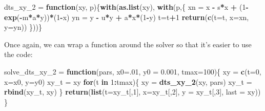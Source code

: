 \documentclass[
]{book}
\newenvironment{Shaded}{\begin{snugshade}}{\end{snugshade}}
\newcommand{\AttributeTok}[1]{\textcolor[rgb]{0.13,0.29,0.53}{#1}}
\newcommand{\ControlFlowTok}[1]{\textcolor[rgb]{0.13,0.29,0.53}{\textbf{#1}}}
\newcommand{\DecValTok}[1]{\textcolor[rgb]{0.00,0.00,0.81}{#1}}
\newcommand{\FloatTok}[1]{\textcolor[rgb]{0.00,0.00,0.81}{#1}}
\newcommand{\FunctionTok}[1]{\textcolor[rgb]{0.13,0.29,0.53}{\textbf{#1}}}
\newcommand{\NormalTok}[1]{#1}
\newcommand{\OtherTok}[1]{\textcolor[rgb]{0.56,0.35,0.01}{#1}}
\newcommand{\SpecialCharTok}[1]{\textcolor[rgb]{0.81,0.36,0.00}{\textbf{#1}}}
\begin{document}
\begin{Shaded}
\begin{Highlighting}[]
\NormalTok{dts\_xy\_2 }\OtherTok{=} \ControlFlowTok{function}\NormalTok{(xy, p)\{}\FunctionTok{with}\NormalTok{(}\FunctionTok{as.list}\NormalTok{(xy), }\FunctionTok{with}\NormalTok{(p,\{}
\NormalTok{  xn }\OtherTok{=}\NormalTok{ x }\SpecialCharTok{{-}}\NormalTok{ s}\SpecialCharTok{*}\NormalTok{x }\SpecialCharTok{+}\NormalTok{ (}\DecValTok{1}\SpecialCharTok{{-}}\FunctionTok{exp}\NormalTok{(}\SpecialCharTok{{-}}\NormalTok{m}\SpecialCharTok{*}\NormalTok{a}\SpecialCharTok{*}\NormalTok{y))}\SpecialCharTok{*}\NormalTok{(}\DecValTok{1}\SpecialCharTok{{-}}\NormalTok{x) }
\NormalTok{  yn }\OtherTok{=}\NormalTok{ y }\SpecialCharTok{{-}}\NormalTok{ u}\SpecialCharTok{*}\NormalTok{y }\SpecialCharTok{+}\NormalTok{ a}\SpecialCharTok{*}\NormalTok{x}\SpecialCharTok{*}\NormalTok{(}\DecValTok{1}\SpecialCharTok{{-}}\NormalTok{y) }
\NormalTok{  t}\OtherTok{=}\NormalTok{t}\SpecialCharTok{+}\DecValTok{1}
  \FunctionTok{return}\NormalTok{(}\FunctionTok{c}\NormalTok{(}\AttributeTok{t=}\NormalTok{t, }\AttributeTok{x=}\NormalTok{xn, }\AttributeTok{y=}\NormalTok{yn))}
\NormalTok{\}))\}}
\end{Highlighting}
\end{Shaded}

Once again, we can wrap a function around the solver so that it's easier to use the code:

\begin{Shaded}
\begin{Highlighting}[]
\NormalTok{solve\_dts\_xy\_2 }\OtherTok{=} \ControlFlowTok{function}\NormalTok{(pars, }\AttributeTok{x0=}\NormalTok{.}\DecValTok{01}\NormalTok{, }\AttributeTok{y0 =} \FloatTok{0.001}\NormalTok{, }\AttributeTok{tmax=}\DecValTok{100}\NormalTok{)\{}
\NormalTok{   xy }\OtherTok{=} \FunctionTok{c}\NormalTok{(}\AttributeTok{t=}\DecValTok{0}\NormalTok{, }\AttributeTok{x=}\NormalTok{x0, }\AttributeTok{y=}\NormalTok{y0) }
\NormalTok{   xy\_t }\OtherTok{=}\NormalTok{ xy }
   \ControlFlowTok{for}\NormalTok{(t }\ControlFlowTok{in} \DecValTok{1}\SpecialCharTok{:}\NormalTok{tmax)\{}
\NormalTok{     xy }\OtherTok{=} \FunctionTok{dts\_xy\_2}\NormalTok{(xy, pars)}
\NormalTok{     xy\_t }\OtherTok{=} \FunctionTok{rbind}\NormalTok{(xy\_t, xy)}
\NormalTok{   \}}
   \FunctionTok{return}\NormalTok{(}\FunctionTok{list}\NormalTok{(}\AttributeTok{t=}\NormalTok{xy\_t[,}\DecValTok{1}\NormalTok{], }\AttributeTok{x=}\NormalTok{xy\_t[,}\DecValTok{2}\NormalTok{], }\AttributeTok{y =}\NormalTok{ xy\_t[,}\DecValTok{3}\NormalTok{], }\AttributeTok{last =}\NormalTok{ xy)) }
\NormalTok{\}}
\end{Highlighting}
\end{Shaded}
\end{document}
